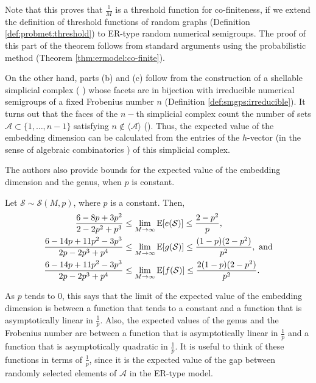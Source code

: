 Note that this proves that $\frac{1}{M}$ is a threshold function for co-finiteness, if we extend the definition of threshold functions of random graphs (Definition \ref{def:probmet:threshold}) to ER-type random numerical semigroups. The proof of this part of the theorem follows from standard arguments using the probabilistic method (Theorem \ref{thm:ermodel:co-finite}). \par
On the other hand, parts (b) and (c) follow from the construction of a shellable simplicial complex ( \cite[Definition 8]{de2018random}) whose facets are in bijection with irreducible numerical semigroups of a fixed Frobenius number $n$ (Definition \ref{def:smgps:irreducible}). It turns out that the faces of the $n-$th simplicial complex count the number of sets $\mathcal{A} \subset \{1, \ldots, n - 1\}$ satisfying $n \notin \langle\mathcal{A} \rangle$ (\cite[Proposition 23]{de2018random}). Thus, the expected value of the embedding dimension can be calculated from the entries of the $h$-vector (in the sense of algebraic combinatorics \cite{stanley2007combinatorics}) of this simplicial complex. \par

The authors also provide bounds for the expected value of the embedding dimension and the genus, when $p$ is constant.

\begin{theorem}\label{thm:ermodel:constantp}
    Let $\mathcal{S} \sim \mathcal{S}(M, p)$, where $p$ is a constant. Then, 
    \begin{align*}
        \frac{6 - 8p + 3p^2}{2 - 2p^2 + p^3} &\leq \lim_{M \to \infty} \mathrm{E}[e(\mathcal{S})] \leq \frac{2 - p^2}{p}, \\
        \frac{6 - 14p + 11p^2 - 3p^3}{2p - 2p^3 + p^4} &\leq \lim_{M \to \infty} \mathrm{E}[g(\mathcal{S})] \leq \frac{(1 - p)(2 - p^2)}{p^2}, \text{ and}\\
        \frac{6 - 14p + 11p^2 - 3p^3}{2p - 2p^3 + p^4} &\leq \lim_{M \to \infty} \mathrm{E}[f(\mathcal{S})] \leq \frac{2(1 - p)(2 - p^2)}{p^2}.
    \end{align*}
\end{theorem}
As $p$ tends to 0, this says that the limit of the expected value of the embedding dimension is between a function that tends to a constant and a function that is asymptotically linear in $\frac{1}{p}$. Also, the expected values of the genus and the Frobenius number are between a function that is asymptotically linear in $\frac{1}{p}$ and a function that is asymptotically quadratic in $\frac{1}{p}$. It is useful to think of these functions in terms of $\frac{1}{p}$, since it is the expected value of the gap between randomly selected elements of $\mathcal{A}$ in the ER-type model. \par 

